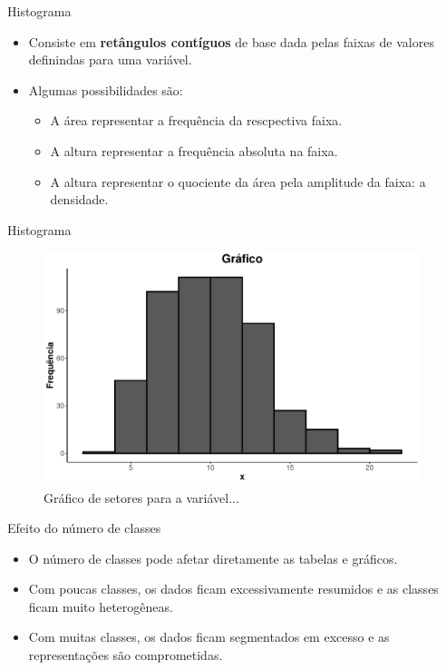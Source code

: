 \documentclass[
  ignorenonframetext,
  serif,
  professionalfont,
  usenames,
  dvipsnames,
  aspectratio = 169]{beamer}
\providecommand{\tightlist}{%
  \setlength{\itemsep}{0pt}\setlength{\parskip}{0pt}}
\renewcommand{\tightlist}{%
  \setlength{\itemsep}{0\baselineskip}
  \setlength{\parskip}{0.25\baselineskip}
}
\begin{document}
\begin{frame}{Histograma}
\protect\hypertarget{histograma}{}
\begin{itemize}
\item
  Consiste em \textbf{retângulos contíguos} de base dada pelas faixas de
  valores definindas para uma variável.
\item
  Algumas possibilidades são:

  \begin{itemize}
  \tightlist
  \item
    A área representar a frequência da rescpectiva faixa.
  \item
    A altura representar a frequência absoluta na faixa.
  \item
    A altura representar o quociente da área pela amplitude da faixa: a
    densidade.
  \end{itemize}
\end{itemize}
\end{frame}

\begin{frame}{Histograma}
\protect\hypertarget{histograma-1}{}
\begin{figure}

{\centering \includegraphics[width=11cm]{200-exploratoria-uni-tabelas-graficos_files/figure-beamer/unnamed-chunk-21-1} 

}

\caption{Gráfico de setores para a variável...}\label{fig:unnamed-chunk-21}
\end{figure}
\end{frame}

\begin{frame}{Efeito do número de classes}
\protect\hypertarget{efeito-do-nuxfamero-de-classes}{}
\begin{itemize}
\item
  O número de classes pode afetar diretamente as tabelas e gráficos.
\item
  Com poucas classes, os dados ficam excessivamente resumidos e as
  classes ficam muito heterogêneas.
\item
  Com muitas classes, os dados ficam segmentados em excesso e as
  representações são comprometidas.
\end{itemize}
\end{frame}
\end{document}
